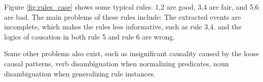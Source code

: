 Figure \ref{fig:rules_case} shows some typical rules: 1,2 are good, 3,4 are fair, and 5,6 are bad.
The main problems of these rules include:
The extracted events are incomplete, which makes the rules less informative, such as rule 3,4.
and the logics of causation in both rule 5 and rule 6 are wrong.

Some other problems also exist, such as insignificant causality caused by the loose causal patterns, verb disambiguation when normalizing predicates, noun disambiguation when generalizing rule instances.

